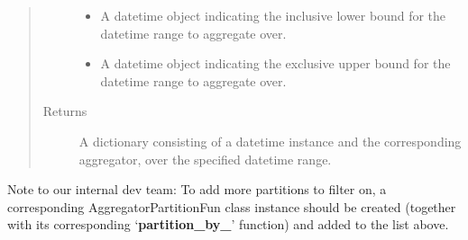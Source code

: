\documentclass[letterpaper,10pt,english]{sphinxmanual}
\begin{document}
\begin{fulllineitems}
\begin{fulllineitems}
\begin{quote}
\begin{description}
\begin{itemize}
\item {} 
 \textendash{} A datetime object indicating the inclusive lower bound for the datetime range to
aggregate over.

\item {} 
 \textendash{} A datetime object indicating the exclusive upper bound for the datetime range to
aggregate over.

\end{itemize}

\item[{Returns}] \leavevmode
A dictionary consisting of a datetime instance and the corresponding aggregator,
over the specified datetime range.

\end{description}\end{quote}

\end{fulllineitems}


\begin{fulllineitems}
\label{\detokenize{pydash_app.dashboard.aggregator.aggregator_group:pydash_app.dashboard.aggregator.aggregator_group.AggregatorGroup.partition_funs}}
Note to our internal dev team:
To add more partitions to filter on, a corresponding AggregatorPartitionFun class instance should be created
(together with its corresponding ‘{\color{red}\bfseries{}partition\_by\_}’ function) and added to the  list above.


\end{fulllineitems}
\end{fulllineitems}
\end{document}
